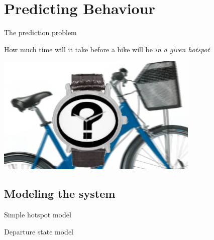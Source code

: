 \section{Predicting Behaviour}
\begin{frame}{The prediction problem}
\begin{center}
\item How much time will it take before a bike will be \emph{in a given hotspot}

\includegraphics[width=0.8\linewidth]{graphics/biketime}
\end{center}

\end{frame}

\subsection{Modeling the system}

\begin{frame}{Simple hotspot model}

\end{frame}

\begin{frame}{Departure state model}

\end{frame}